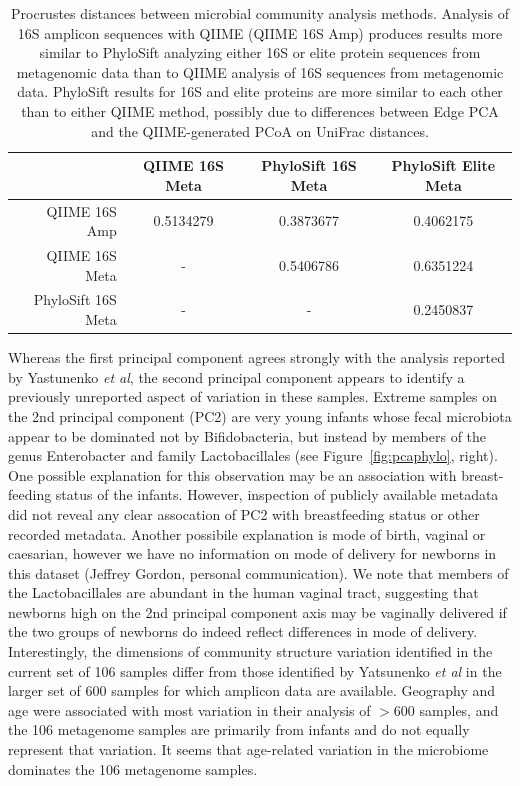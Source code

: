 \documentclass[10pt]{article}
\begin{document}
\begin{table}
\begin{tabular}{|r||c|c|c|}
  \hline
   & QIIME 16S Meta & PhyloSift 16S Meta & PhyloSift Elite Meta \\
  \hline
  \hline
  QIIME 16S Amp & 0.5134279 & 0.3873677 & 0.4062175 \\
  \hline
  QIIME 16S Meta & - & 0.5406786 & 0.6351224 \\
  \hline
  PhyloSift 16S Meta & - & - & 0.2450837 \\
  \hline 
\end{tabular}
\caption{Procrustes distances between microbial community analysis methods. Analysis of 16S amplicon sequences with QIIME (QIIME 16S Amp) produces results more similar to PhyloSift analyzing either 16S or elite protein sequences from metagenomic data than to QIIME analysis of 16S sequences from metagenomic data. PhyloSift results for 16S and elite proteins are more similar to each other than to either QIIME method, possibly due to differences between Edge PCA and the QIIME-generated PCoA on UniFrac distances.}
\end{table}

Whereas the first principal component agrees strongly with the analysis reported by Yastunenko \textit{et al}, the second principal component appears to identify a previously unreported aspect of variation in these samples.
Extreme samples on the 2nd principal component (PC2) are very young infants whose fecal microbiota appear to be dominated not by Bifidobacteria, but instead by members of the genus Enterobacter and family Lactobacillales (see Figure~\ref{fig:pcaphylo}, right).
One possible explanation for this observation may be an association with breast-feeding status of the infants.
However, inspection of publicly available metadata did not reveal any clear assocation of PC2 with breastfeeding status or other recorded metadata.
Another possibile explanation is mode of birth, vaginal or caesarian, however we have no information on mode of delivery for newborns in this dataset (Jeffrey Gordon, personal communication).
We note that members of the Lactobacillales are abundant in the human vaginal tract, suggesting that newborns high on the 2nd principal component axis may be vaginally delivered if the two groups of newborns do indeed reflect differences in mode of delivery.
Interestingly, the dimensions of community structure variation identified in the current set of 106 samples differ from those identified by Yatsunenko \textit{et al} in the larger set of 600 samples for which amplicon data are available.
Geography and age were associated with most variation in their analysis of $>$600 samples, and the 106 metagenome samples are primarily from infants and do not equally represent that variation.
It seems that age-related variation in the microbiome dominates the 106 metagenome samples.
\end{document}
